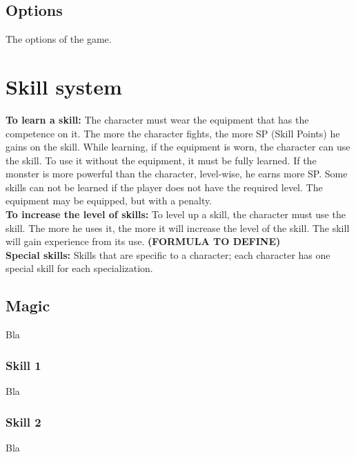 \documentclass[a4paper,12pt]{book}
\begin{document}
\subsection{Options}
The options of the game.
\section{Skill system}
\textbf{To learn a skill:} The character must wear the equipment that has the competence on it. The more the character fights, the more SP (Skill Points) he gains on the skill. While learning, if the equipment is worn, the character can use the skill. To use it without the equipment, it must be fully learned. If the monster is more powerful than the character, level-wise, he earns more SP. Some skills can not be learned if the player does not have the required level. The equipment may be equipped, but with a penalty. \\
\textbf{To increase the level of skills:} To level up a skill, the character must use the skill. The more he uses it, the more it will increase the level of the skill. The skill will gain experience from its use. \textbf{(FORMULA TO DEFINE)} \\
\textbf{Special skills:} Skills that are specific to a character; each character has one special skill for each specialization.
\subsection{Magic}
Bla
\subsubsection{Skill 1}
Bla
\subsubsection{Skill 2}
Bla
\end{document}
